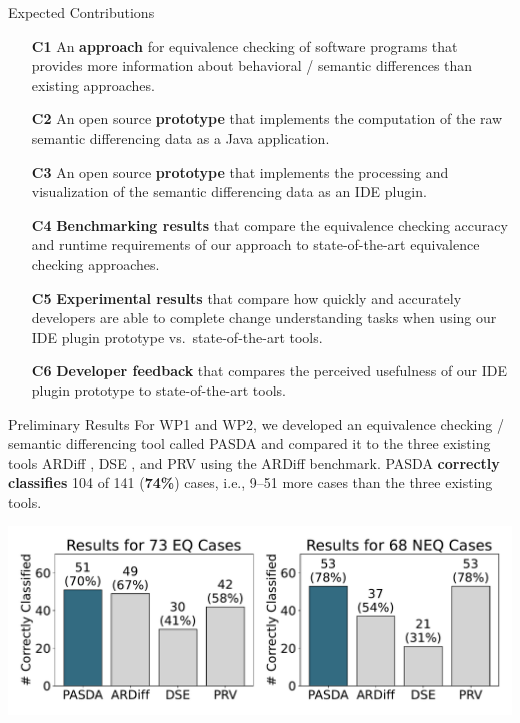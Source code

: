 \documentclass[final,hyperref={pdfpagelabels=false}]{beamer}
\newcommand{\shrink}{-15pt}
\begin{document}
\begin{frame}[t]
\begin{columns}[t]
  \begin{column}{.47\textwidth} %
    \vspace{\shrink}
    \begin{block}{Expected Contributions}
      \begin{itemize}
        \item[\textbf{C1}] An \textbf{approach} for equivalence checking of software programs that provides more information about behavioral / semantic differences than existing approaches.
        \item[\textbf{C2}] An open source \textbf{prototype} that implements the computation of the raw semantic differencing data as a Java application.
        \item[\textbf{C3}] An open source \textbf{prototype} that implements the processing and visualization of the semantic differencing data as an IDE plugin.
        \item[\textbf{C4}] \textbf{Benchmarking results} that compare the equivalence checking accuracy and runtime requirements of our approach to state-of-the-art equivalence checking approaches.
        \item[\textbf{C5}] \textbf{Experimental results} that compare how quickly and accurately developers are able to complete change understanding tasks when using our IDE plugin prototype vs.\ state-of-the-art tools.
        \item[\textbf{C6}] \textbf{Developer feedback} that compares the perceived usefulness of our IDE plugin prototype to state-of-the-art tools.
      \end{itemize}
    \end{block}

    \begin{block}{Preliminary Results}
      For WP1 and WP2, we developed an equivalence checking / semantic differencing tool called PASDA \cite{glock2024pasda} and compared it to the three existing tools ARDiff \cite{badihi2020ardiff}, DSE \cite{person2008dse}, and PRV \cite{boehme2013prv} using the ARDiff benchmark.  PASDA \textbf{correctly classifies} 104 of 141 (\textbf{74\%}) cases, i.e., 9--51 more cases than the three existing tools.

      \vspace{-6pt}
      \begin{center}
        \includegraphics[width=\columnwidth]{classification-accuracy}
      \end{center}
      \vspace{-24pt}


\end{block}
\end{column}
\end{columns}
\end{frame}
\end{document}
